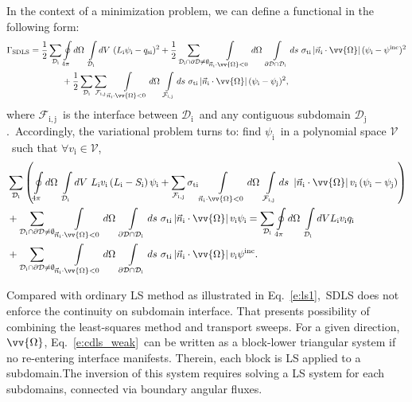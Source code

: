 \documentclass[review]{elsarticle}
\newcommand{\nno}{\nonumber}
\newcommand{\psii}[1]{\psi^\mathrm{inc}_\mathrm{{#1}}}
\newcommand{\mm}[1]{\mathrm{#1}}
\newcommand{\pd}{{\partial\mathcal{D}}}
\newcommand{\intli}[1]{\int\limits_{{#1}}}
\newcommand{\ointli}[1]{\oint\limits_{{#1}}}
\newcommand{\dii}{{\mathcal{D}_\mathrm{i}}}
\newcommand{\djj}{{\mathcal{D}_\mathrm{j}}}
\newcommand{\fij}{{\mathcal{F}_\mathrm{i,j}}}
\newcommand{\slim}[1]{\sum\limits_{\tiny#1}}
\newcommand{\nido}{\vec{n}_\mathrm{i}\cdot\ome}
\newcommand{\absnido}{\left|\nido\right|}
\newcommand{\ome}{\vv{\Omega}}
\begin{document}
In the context of a minimization problem, we can define a functional in the following form:
\begin{align}\label{e:cdls_func}
\Gamma_\mathrm{SDLS}=\frac{1}{2}\slim{\dii}&\ointli{4\pi}d\Omega\ \intli{\dii}dV\ (L_\mathrm{i}\psi_\mathrm{i}-q_\mathrm{si})^2+{\frac{1}{2}\slim{\dii\cap\pd\neq\emptyset}\intli{\nido<0}d\Omega\ \intli{\pd\cap\dii}ds\ \sigma_\mm{ti}\absnido(\psi_\mm{i}-\psii{})^2}\nonumber\\
&+\frac{1}{2}\slim{\dii}\slim{\fij}\intli{\nido<0}d\Omega\ \intli{\fij}ds\ \sigma_\mathrm{ti}\absnido({\psi_\mm{i}-\psi_\mm{j}})^2,
\end{align}
where $\fij$\ is the interface between $\dii$\ and any contiguous subdomain $\djj$.\ Accordingly, the variational problem turns to: find $\psi_\mathrm{i}$\ in a polynomial space $\mathcal{V}$\ such that $\forall v_\mathrm{i}\in\mathcal{V}$,\
\begin{align}\label{e:cdls_weak}
&\slim{\dii}\left(\ointli{4\pi}d\Omega\ \intli{\dii}dV\ L_\mathrm{i}v_\mathrm{i}\left(L_\mathrm{i}-S_\mathrm{i}\right)\psi_\mathrm{i}+\slim{\fij}\sigma_\mathrm{ti}\intli{\nido<0}d\Omega\ \intli{\fij}ds\  \absnido v_\mathrm{i}\left(\psi_\mathrm{i}-\psi_\mathrm{j}\right)\right)\nno\\
&+{\slim{\dii\cap\pd\neq\emptyset}\intli{\nido<0}d\Omega\ \intli{\pd\cap\dii}ds\ \sigma_\mm{ti}\absnido v_\mm{i}\psi_\mm{i}}=\slim{\dii}\ointli{4\pi}d\Omega\ \intli{\dii}dV L_\mathrm{i}v_\mathrm{i}q_\mathrm{i}\\
&+{\slim{\dii\cap\pd\neq\emptyset}\intli{\nido<0}d\Omega\ \intli{\pd\cap\dii}ds\ \sigma_\mm{ti}\absnido v_\mm{i}\psii{}.}\nno
\end{align}

Compared with ordinary LS method as illustrated in Eq.\ \eqref{e:ls1},\ SDLS does not enforce the continuity on subdomain interface. That presents possibility of combining the least-squares method and transport sweeps. For a given direction, $\ome$, Eq.~\eqref{e:cdls_weak}\ can be written as a block-lower triangular system {if no re-entering interface manifests}. Therein, each block is LS applied to a subdomain.The inversion of this system requires solving a LS system for each subdomains, connected via boundary angular fluxes. %

\end{document}
